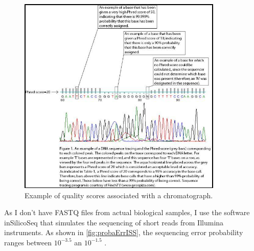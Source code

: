 \documentclass[12pt]{article}
\begin{document}
\begin{figure}[ht]
\begin{center}
 \includegraphics[width = 0.9\textwidth]{figs/Phred.jpg}
\caption{Example of quality scores associated with a chromatograph.}
\label{fig:phred}
\end{center}
\end{figure}

As I don't have FASTQ files from actual biological samples, I use the software  \textsf{inSilicoSeq} that simulates the sequencing of short reads from Illumina instruments. 
As shown in \autoref{fig:probaErrISS}, the sequencing error probability ranges between $10^{-3.5}$ an $10^{-1.5}$ .  
\end{document}
